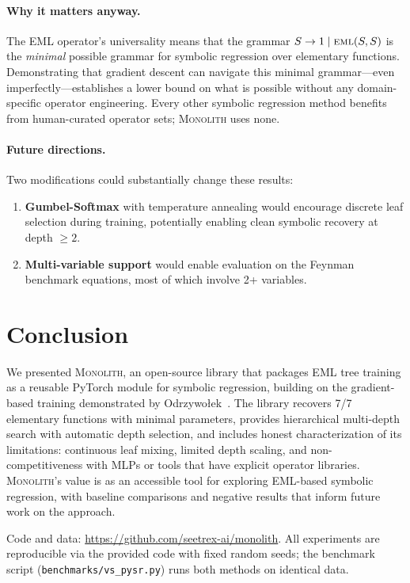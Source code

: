 \documentclass[11pt,a4paper]{article}
\newcommand{\eml}{\textsc{eml}}
\newcommand{\monolith}{\textsc{Monolith}}
\begin{document}
\paragraph{Why it matters anyway.}
The EML operator's universality means that the grammar $S \to 1 \mid \eml(S, S)$ is the \emph{minimal} possible grammar for symbolic regression over elementary functions.
Demonstrating that gradient descent can navigate this minimal grammar---even imperfectly---establishes a lower bound on what is possible without any domain-specific operator engineering.
Every other symbolic regression method benefits from human-curated operator sets; \monolith{} uses none.

\paragraph{Future directions.}
Two modifications could substantially change these results:
\begin{enumerate}
    \item \textbf{Gumbel-Softmax} with temperature annealing would encourage discrete leaf selection during training, potentially enabling clean symbolic recovery at depth $\geq 2$.
    \item \textbf{Multi-variable support} would enable evaluation on the Feynman benchmark equations, most of which involve 2+ variables.
\end{enumerate}

\section{Conclusion}

We presented \monolith{}, an open-source library that packages EML tree training as a reusable PyTorch module for symbolic regression, building on the gradient-based training demonstrated by Odrzywołek~\citep{odrzywołek2026eml}.
The library recovers 7/7 elementary functions with minimal parameters, provides hierarchical multi-depth search with automatic depth selection, and includes honest characterization of its limitations: continuous leaf mixing, limited depth scaling, and non-competitiveness with MLPs or tools that have explicit operator libraries.
\monolith{}'s value is as an accessible tool for exploring EML-based symbolic regression, with baseline comparisons and negative results that inform future work on the approach.

Code and data: \url{https://github.com/seetrex-ai/monolith}.
All experiments are reproducible via the provided code with fixed random seeds; the benchmark script (\texttt{benchmarks/vs\_pysr.py}) runs both methods on identical data.
\end{document}
